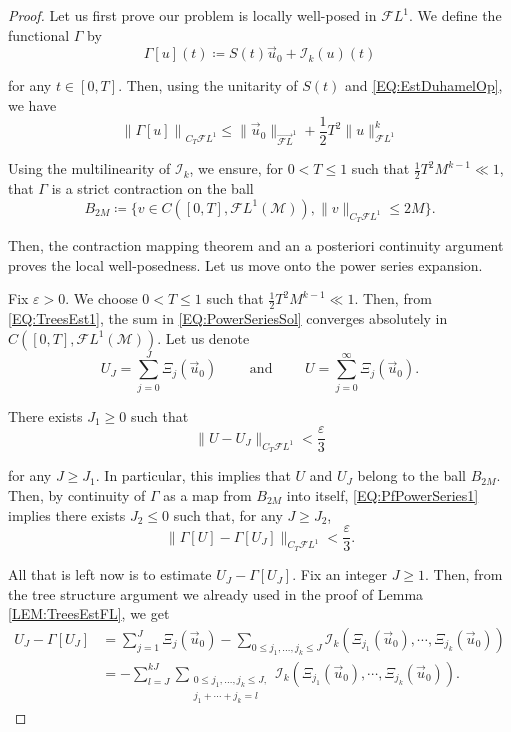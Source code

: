 \documentclass[letterpaper, 11pt,  reqno]{amsart}
\newcommand{\1}{\hspace{0.5mm}\text{I}\hspace{0.5mm}}
\newcommand{\I}{\mathcal{I}}
\newcommand{\noi}{\noindent}
\newcommand{\M}{\mathcal{M}}
\newcommand{\FL}{\mathcal{F}L} %
\newcommand{\FLv}{\overrightarrow{\mathcal{F}L}}
\newcommand{\eps}{\varepsilon}
\newcommand{\G}{\Gamma}
\numberwithin{equation}{section}
\numberwithin{theorem}{section}
\begin{document}
\begin{proof}

Let us first prove our problem is locally well-posed in $\FL^1$. We define the functional $\G$ by
$$
\G [u] (t) \coloneqq S(t)\vec{u}_0 + \I_k (u)(t)
$$

\noi for any $t \in [0,T]$. Then, using the unitarity of $S(t)$ and \eqref{EQ:EstDuhamelOp}, we have
$$
\left\| \G[u] \right\|_{C_T \FL^1} \leq \| \vec{u}_0 \|_{\FLv^1} + \frac 12 T^2 \| u \|_{\FL^1}^k
$$

\noi Using the multilinearity of $\I_k$, we ensure, for $0 < T \leq 1$ such that $\frac 12 T^2 M^{k-1} \ll 1$, that $\G$ is a strict contraction on the ball
$$
B_{2M} \coloneqq \{ v \in C([0,T], \FL^1 (\M)), \| v \|_{C_T \FL^1} \leq 2M\}.
$$

\noi Then, the contraction mapping theorem and an a posteriori continuity argument proves the local well-posedness. Let us move onto the power series expansion. 

Fix $\eps >0$. We choose $0 < T \leq 1$ such that $\frac 12 T^2 M^{k-1} \ll 1$. Then, from \eqref{EQ:TreesEst1}, the sum in \eqref{EQ:PowerSeriesSol} converges absolutely in $C([0,T], \FL^1 (\M))$. Let us denote 
$$
U_J = \sum_{j = 0}^J \Xi_j (\vec{u}_0) \qquad \text{ and } \qquad U = \sum_{j = 0}^\infty \Xi_j (\vec{u}_0).
$$

\noi There exists $J_1 \geq 0$ such that 
\begin{equation}
\label{EQ:PfPowerSeries1}
\| U - U_J \|_{C_T \FL^1} < \frac \eps3
\end{equation}

\noi for any $J \geq J_1$. In particular, this implies that $U$ and $U_J$ belong to the ball $B_{2M}$. Then, by continuity of $\G$ as a map from $B_{2M}$ into itself, \eqref{EQ:PfPowerSeries1} implies there exists $J_2 \leq 0$ such that, for any $J \geq J_2$,
\begin{equation}
\label{EQ:PfPowerSeries2}
\| \G[U] - \G[U_J] \|_{C_T \FL^1} < \frac \eps3.
\end{equation}

\noi All that is left now is to estimate $U_J - \G[U_J]$. Fix an integer $J \geq 1$. Then, from the tree structure argument we already used in the proof of Lemma \ref{LEM:TreesEstFL}, we get
\begin{align*}
U_J - \G[U_J] & = \sum_{j = 1}^J \Xi_j (\vec{u}_0) - \sum_{0 \leq j_1, \dots, j_k \leq J} \I_k \left( \Xi_{j_1}(\vec{u}_0) , \cdots,  \Xi_{j_k} (\vec{u}_0) \right) \\
	& = - \sum^{kJ}_{l = J} \sum_{\substack{0 \leq j_1 , \dots, j_k \leq J, \\ j_1 + \cdots + j_k = l}} \I_k \left( \Xi_{j_1}(\vec{u}_0) , \cdots, \Xi_{j_k} (\vec{u}_0) \right).
\end{align*}


\end{proof}
\end{document}

